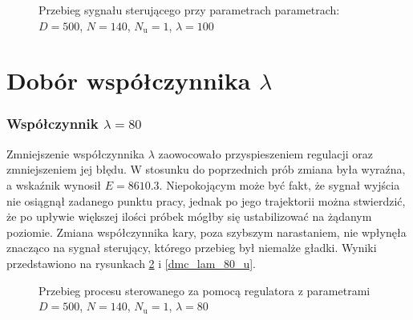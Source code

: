 \begin{figure}[b]
    \centering
    \caption{Przebieg sygnału sterującego przy parametrach parametrach: $D = 500$, $N = 140$, $N_{\mathrm{u}} = 1$, $\lambda = 100$}
    \label{dmc_Nu_1_u_pro}
\end{figure}
\FloatBarrier

\section{Dobór współczynnika $\lambda$}
\subsubsection{Współczynnik $\lambda = 80$}
Zmniejszenie współczynnika $\lambda$ zaowocowało przyspieszeniem regulacji oraz zmniejszeniem jej błędu. W stosunku do poprzednich prób zmiana była wyraźna, a wskaźnik wynosił $E = \num{8610,3}$. Niepokojącym może być fakt, że sygnał wyjścia nie osiągnął zadanego punktu pracy, jednak po jego trajektorii można stwierdzić, że po upływie większej ilości próbek mógłby się ustabilizować na żądanym poziomie. Zmiana współczynnika kary, poza szybszym narastaniem, nie wpłynęła znacząco na sygnał sterujący, którego przebieg był niemalże gładki. Wyniki przedstawiono na rysunkach \ref{dmc_lam_80_y} i \ref{dmc_lam_80_u}.

\begin{figure}[t]
    \centering
    \caption{Przebieg procesu sterowanego za pomocą regulatora z parametrami $D = 500$, $N = 140$, $N_{\mathrm{u}} = 1$, $\lambda = 80$}
    \label{dmc_lam_80_y}
\end{figure}

